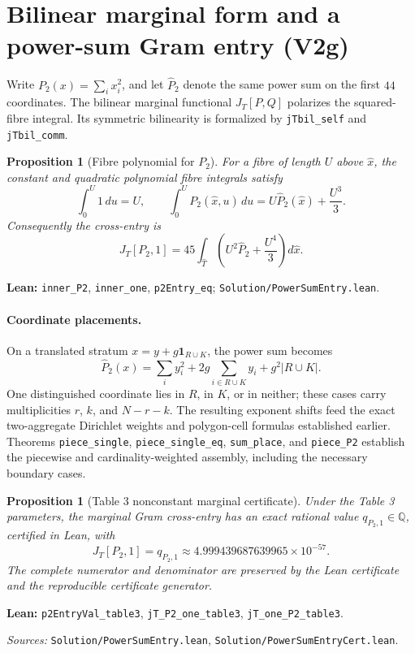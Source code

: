 \documentclass[11pt]{article}
\newtheorem{proposition}[theorem]{Proposition}
\newcommand{\Q}{\mathbb{Q}}
\newcommand{\code}[1]{\texttt{#1}}
\begin{document}
\section{Bilinear marginal form and a power-sum Gram entry (V2g)}\label{sec:v2g}
Write $P_2(x)=\sum_i x_i^2$, and let $\widehat P_2$ denote the same
power sum on the first $44$ coordinates. The bilinear marginal functional
$J_T[P,Q]$ polarizes the squared-fibre integral. Its symmetric bilinearity
is formalized by \code{jTbil\_self} and \code{jTbil\_comm}.

\begin{proposition}[Fibre polynomial for $P_2$]\label{prop:p2inner}
For a fibre of length $U$ above $\widehat x$, the constant and quadratic
polynomial fibre integrals satisfy
\[
 \int_0^U 1\,du=U,\qquad
 \int_0^U P_2(\widehat x,u)\,du
 =U\widehat P_2(\widehat x)+\frac{U^3}{3}.
\]
Consequently the cross-entry is
\begin{equation}\label{eq:p2cross}
 J_T[P_2,1]
 =45\int_{\widehat T}\left(U^2\widehat P_2+\frac{U^4}{3}\right)d\widehat x.
\end{equation}
\end{proposition}
\noindent\textbf{Lean:} \code{inner\_P2}, \code{inner\_one},
\code{p2Entry\_eq}; \nolinkurl{Solution/PowerSumEntry.lean}.

\paragraph{Coordinate placements.}
On a translated stratum $x=y+g\mathbf1_{R\cup K}$, the power sum becomes
\[
 \widehat P_2(x)=\sum_i y_i^2
   +2g\sum_{i\in R\cup K}y_i+g^2|R\cup K|.
\]
One distinguished coordinate lies in $R$, in $K$, or in neither;
these cases carry multiplicities $r$, $k$, and $N-r-k$.
The resulting exponent shifts feed the exact two-aggregate Dirichlet
weights and polygon-cell formulas established earlier.
Theorems \code{piece\_single}, \code{piece\_single\_eq},
\code{sum\_place}, and \code{piece\_P2} establish the piecewise and
cardinality-weighted assembly, including the necessary boundary cases.

\begin{proposition}[Table 3 nonconstant marginal certificate]\label{prop:p2cert}
Under the Table 3 parameters, the marginal Gram cross-entry has an exact
rational value $q_{P_2,1}\in\Q$, certified in Lean, with
\[
 J_T[P_2,1]=q_{P_2,1}
 \approx 4.999439687639965\times10^{-57}.
\]
The complete numerator and denominator are preserved by the Lean
certificate and the reproducible certificate generator.
\end{proposition}
\noindent\textbf{Lean:} \code{p2EntryVal\_table3},
\code{jT\_P2\_one\_table3}, \code{jT\_one\_P2\_table3}.\par
\noindent\textit{Sources:} \nolinkurl{Solution/PowerSumEntry.lean},
\nolinkurl{Solution/PowerSumEntryCert.lean}.
\end{document}
